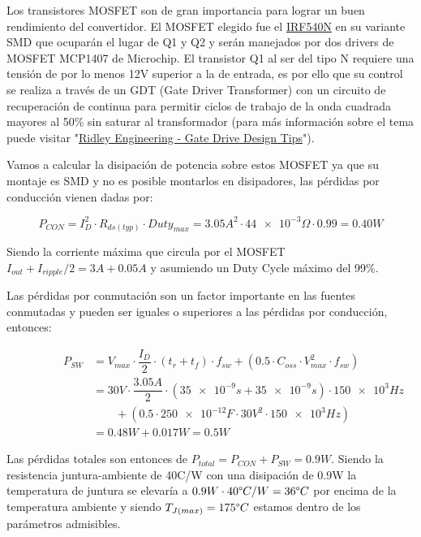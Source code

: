 \documentclass[12pt]{report}
\begin{document}
	Los transistores MOSFET son de gran importancia para lograr un buen rendimiento del convertidor. El MOSFET elegido fue el \href{http://www.irf.com/product-info/datasheets/data/irf540ns.pdf}{IRF540N} en su variante SMD que ocuparán el lugar de Q1 y Q2 y serán manejados por dos drivers de MOSFET MCP1407 de Microchip\textregistered. El transistor Q1 al ser del tipo N requiere una tensión de por lo menos 12V superior a la de entrada, es por ello que su control se realiza a través de un GDT (Gate Driver Transformer) con un circuito de recuperación de continua para permitir ciclos de trabajo de la onda cuadrada mayores al 50\% sin saturar al transformador (para más información sobre el tema puede visitar "\href{http://ridleyengineering.com/design-center-ridley-engineering/49-circuit-designs/45-3-gate-drive-design-tips.html}{Ridley Engineering - Gate Drive Design Tips}").
	
	Vamos a calcular la disipación de potencia sobre estos MOSFET ya que su montaje es SMD y no es posible montarlos en disipadores, las pérdidas por conducción vienen dadas por:
	
	\begin{equation}
	P_{CON} = I_D^2 \cdot R_{ds(typ)} \cdot Duty_{max} =  3.05A^2 \cdot \num{44e-3}\Omega \cdot 0.99 = 0.40W
	\end{equation}
	
	Siendo la corriente máxima que circula por el MOSFET $I_{out} + I_{ripple}/2 = 3A + 0.05A$ y asumiendo un Duty Cycle máximo del 99\%.
	
	Las pérdidas por conmutación son un factor importante en las fuentes conmutadas y pueden ser iguales o superiores a las pérdidas por conducción, entonces:
	
	\begin{equation}
		\begin{aligned}
		\qquad \qquad P_{SW} &= V_{max} \cdot \dfrac{I_D}{2} \cdot (t_r + t_f) \cdot f_{sw} + (0.5 \cdot C_{oss} \cdot V_{max}^2 \cdot f_{sw})\\
		& = 30V \cdot \dfrac{3.05A}{2} \cdot (\num{35e-9}s + \num{35e-9}s) \cdot \num{150e3}Hz \\
		& \qquad + (0.5 \cdot \num{250e-12}F \cdot 30V^2 \cdot \num{150e3}Hz)\\
		& = 0.48W + 0.017W = 0.5W
		\end{aligned}
	\end{equation}
	
	Las pérdidas totales son entonces de $P_{total} = P_{CON} + P_{SW} = 0.9W$. Siendo la resistencia juntura-ambiente de 40\textdegree C/W con una disipación de 0.9W la temperatura de juntura se elevaría a $0.9W \cdot 40\degree C/W = 36\degree C$ por encima de la temperatura ambiente y siendo $T_{J(max)} = 175\degree C$ estamos dentro de los parámetros admisibles.
\end{document}
